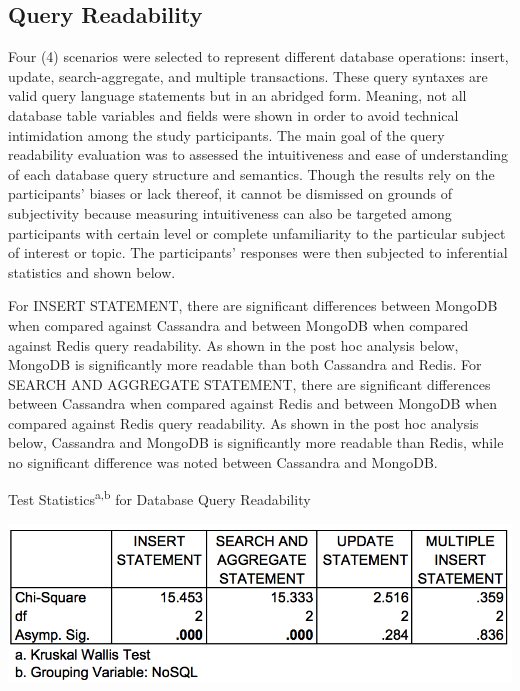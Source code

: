 \documentclass[5p]{elsarticle}
\begin{document}
\subsection{Query Readability}
Four (4) scenarios were selected to represent different database operations: 
insert, update, search-aggregate, and multiple transactions. 
These query syntaxes are valid query language statements but in an abridged form. 
Meaning, not all database table variables and fields were shown in order to avoid technical intimidation among the study participants. 
The main goal of the query readability evaluation was to assessed the intuitiveness and ease of understanding 
of each database query structure and semantics. 
Though the results rely on the participants’ biases or lack thereof, it cannot be dismissed on grounds of subjectivity because measuring intuitiveness 
can also be targeted among participants with certain level or complete unfamiliarity to the particular subject of interest or topic. 
The participants’ responses were then subjected to inferential statistics and shown below.

For INSERT STATEMENT, there are significant differences between MongoDB when compared against Cassandra and between MongoDB when compared against Redis query readability. 
As shown in the post hoc analysis below, MongoDB is significantly more readable than both Cassandra and Redis.
For SEARCH AND AGGREGATE STATEMENT, there are significant differences between Cassandra when compared against Redis and between MongoDB when compared against Redis query readability. 
As shown in the post hoc analysis below, Cassandra and MongoDB is significantly more readable than Redis, while no significant difference was noted between Cassandra and MongoDB.

\begin{table}[ht]
    \centering
    \caption{Test Statistics\textsuperscript{a,b} for Database Query Readability }
    \includegraphics[scale=0.28] {Readability}
    \label{fig.readability}
\end{table}
	
\end{document}
